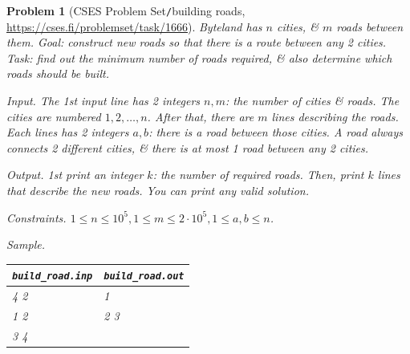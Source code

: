 \documentclass[oneside]{book}
\newtheorem{problem}{Problem}
\begin{document}
\begin{problem}[CSES Problem Set{\tt/}building roads, \url{https://cses.fi/problemset/task/1666}]
	Byteland has $n$ cities, \& $m$ roads between them. Goal: construct new roads so that there is a route between any 2 cities. Task: find out the minimum number of roads required, \& also determine which roads should be built.
	\item {\sf Input.} The 1st input line has 2 integers $n,m$: the number of cities \& roads. The cities are numbered $1,2,\ldots,n$. After that, there are $m$ lines describing the roads. Each lines has 2 integers $a,b$: there is a road between those cities. A road always connects 2 different cities, \& there is at most 1 road between any 2 cities.
	\item {\sf Output.} 1st print an integer $k$: the number of required roads. Then, print $k$ lines that describe the new roads. You can print any valid solution.
	\item {\sf Constraints.} $1\le n\le10^5,1\le m\le2\cdot10^5,1\le a,b\le n$.
	\item {\sf Sample.}
	\begin{table}[H]
		\centering
		\begin{tabular}{|l|l|}
			\hline
			\verb|build_road.inp| & \verb|build_road.out| \\
			\hline
			4 2 & 1 \\
			1 2 & 2 3 \\
			3 4 &  \\
			\hline
		\end{tabular}
	\end{table}
\end{problem}
\end{document}
